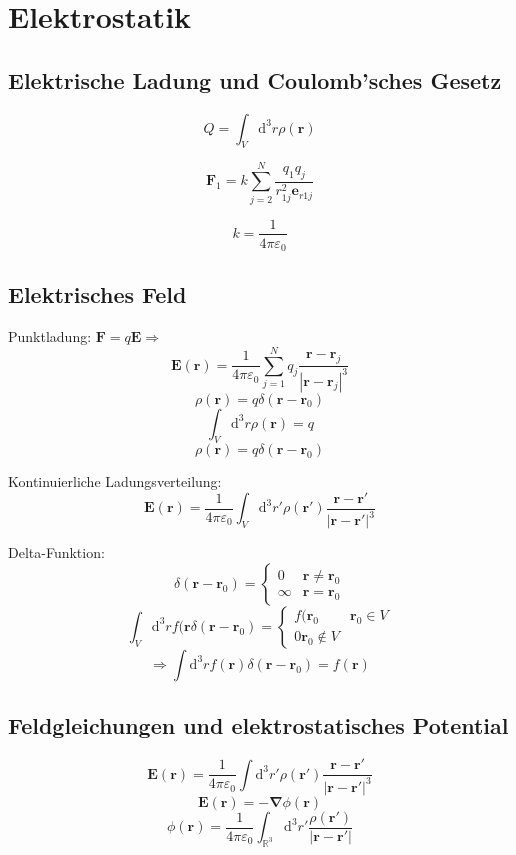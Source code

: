 \documentclass[titlepage,11pt,a4paper,ngerman]{report}
\newcommand{\dd}{\mathrm{d}}
\renewcommand{\vec}[1]{\bm{#1}}
\renewcommand{\epsilon}{\varepsilon}
\newcommand{\vabla}{\vec{\nabla}}
\newcommand{\vepsilon}{\varepsilon}
\begin{document}
\section{Elektrostatik}

\subsection{Elektrische Ladung und Coulomb'sches Gesetz}

\[Q=\int_V\dd^3r\rho(\vec{r})\]

\[\vec{F}_1=k\sum_{j=2}^N\frac{q_1q_j}{r^2_{1j}\vec{e}_{r1j}}\]

\[k=\frac{1}{4\pi\vepsilon_0}\]

\subsection{Elektrisches Feld}

Punktladung:
$\vec{F}=q\vec{E}\Rightarrow$
\[\vec{E}(\vec{r})=\frac{1}{4\pi\vepsilon_0}\sum_{j=1}^Nq_j\frac{\vec{r}-\vec{r}_j}{|\vec{r}-\vec{r}_j|^3}\]
\[\rho(\vec{r})=q\delta(\vec{r}-\vec{r}_0)\]
\[\int_V\dd^3r\rho(\vec{r})=q\]
\[\rho(\vec{r})=q\delta(\vec{r}-\vec{r}_0)\]

Kontinuierliche Ladungsverteilung:
\[\vec{E}(\vec{r})=\frac{1}{4\pi\vepsilon_0}\int_V\dd^3r'\rho(\vec{r}')\frac{\vec{r}-\vec{r}'}{|\vec{r}-\vec{r}'|^3}\]

Delta-Funktion:
\[\delta(\vec{r}-\vec{r}_0)=\begin{cases}0&\vec{r}\neq\vec{r}_0\\\infty&\vec{r}=\vec{r}_0\end{cases}\]
\[\int_V\dd^3rf(\vec{r}\delta(\vec{r}-\vec{r}_0)=\begin{cases}f(\vec{r}_0&\vec{r}_0\in V\\0\vec{r}_0\notin V\end{cases}\]
\[\Rightarrow\int\dd^3rf(\vec{r})\delta(\vec{r}-\vec{r}_0)=f(\vec{r})\]

\subsection{Feldgleichungen und elektrostatisches Potential}
\[\vec{E}(\vec{r})=\frac{1}{4\pi\epsilon_0}\int\dd^3r'\rho(\vec{r}')\frac{\vec{r}-\vec{r}'}{|\vec{r}-\vec{r}'|^3}\]
\[\vec{E}(\vec{r})=-\vabla\phi(\vec{r})\]
\[\phi(\vec{r})=\frac{1}{4\pi\epsilon_0}\int_{\mathbb{R}^3}\dd^3r'\frac{\rho(\vec{r}')}{|\vec{r}-\vec{r}'|}\]
\end{document}
